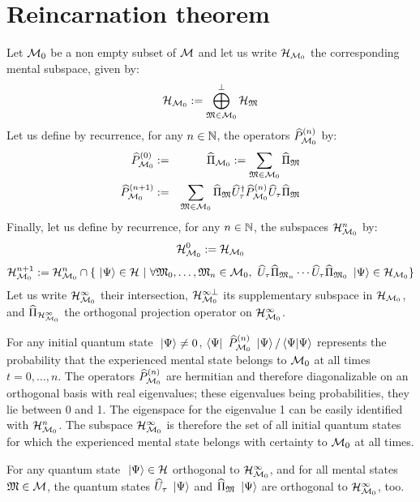 \section{Reincarnation theorem}

 Let $\mathcal M_0$ be a non empty subset of $\mathcal M$ and let us write $\mathcal H_{\mathcal M_0}$ the corresponding mental subspace, given by:
\begin{equation*}
\mathcal H_{\mathcal M_0} := \bigoplus_{\mathfrak{M} \in \mathcal M_0}^\perp \mathcal H_{\mathfrak{M}}
\end{equation*}
Let us define by recurrence, for any $n \in \mathbb{N}$, the operators $\widehat{P}_{\mathcal M_0}^{(n)}$ by:
\begin{eqnarray*}
\widehat{P}_{\mathcal M_0}^{(0)} & := & \widehat{\Pi}_{\mathcal M_0} := \sum_{\mathfrak{M} \in \mathcal M_0} \widehat{\Pi}_{\mathfrak{M}} \\
\widehat{P}_{\mathcal M_0}^{(n+1)} & := & \sum_{\mathfrak{M} \in \mathcal M_0} \widehat{\Pi}_{\mathfrak{M}} \widehat{U}^{\dagger}_\tau \widehat{P}_{\mathcal M_0}^{(n)} \widehat{U}_\tau \widehat{\Pi}_{\mathfrak{M}}
\end{eqnarray*}
Finally, let us define by recurrence, for any $n \in \mathbb{N}$, the subspaces $\mathcal H_{\mathcal M_0}^n$ by:
\begin{equation*}
\mathcal H_{\mathcal M_0}^0 := \mathcal H_{\mathcal M_0}
\end{equation*}
\begin{equation*}
\mathcal H_{\mathcal M_0}^{n+1} := \mathcal H_{\mathcal M_0}^n \cap \{ \ \left|{\Psi}\right\rangle \in \mathcal H\ |\ \forall \mathfrak{M}_0, \dotsc, \mathfrak{M}_n \in \mathcal M_0,\ \widehat{U}_\tau \widehat{\Pi}_{\mathfrak{M}_n} \dotsm \widehat{U}_\tau \widehat{\Pi}_{\mathfrak{M}_0} \ \left|{\Psi}\right\rangle \in \mathcal H_{\mathcal M_0} \}
\end{equation*}
Let us write $\mathcal H_{\mathcal M_0}^\infty$ their intersection, $\mathcal H_{\mathcal M_0}^{\infty \perp}$ its supplementary subspace in $\mathcal H_{\mathcal M_0}$, and $\widehat{\Pi}_{\mathcal H_{\mathcal M_0}^\infty}$ the orthogonal projection operator on $\mathcal H_{\mathcal M_0}^\infty$.

 For any initial quantum state $\ \left|{\Psi}\right\rangle \neq 0$, $\left\langle{\Psi}\right|\  \widehat{P}_{\mathcal M_0}^{(n)} \ \left|{\Psi}\right\rangle / \left\langle{\Psi}|{\Psi}\right\rangle$ represents the probability that the experienced mental state belongs to $\mathcal M_0$ at all times $t = 0, \dotsc, n$. The operators $\widehat{P}_{\mathcal M_0}^{(n)}$ are hermitian and therefore diagonalizable on an orthogonal basis with real eigenvalues; these eigenvalues being probabilities, they lie between 0 and 1. The eigenspace for the eigenvalue 1 can be easily identified with $\mathcal H_{\mathcal M_0}^n$. The subspace $\mathcal H_{\mathcal M_0}^\infty$ is therefore the set of all initial quantum states for which the experienced mental state belongs with certainty to $\mathcal M_0$ at all times.

 For any quantum state $\ \left|{\Psi}\right\rangle \in \mathcal H$ orthogonal to $\mathcal H_{\mathcal M_0}^\infty$, and for all mental states $\mathfrak{M} \in \mathcal M$, the quantum states $\widehat{U}_\tau \ \left|{\Psi}\right\rangle$ and $\widehat{\Pi}_{\mathfrak{M}} \ \left|{\Psi}\right\rangle$ are orthogonal to $\mathcal H_{\mathcal M_0}^\infty$, too.

